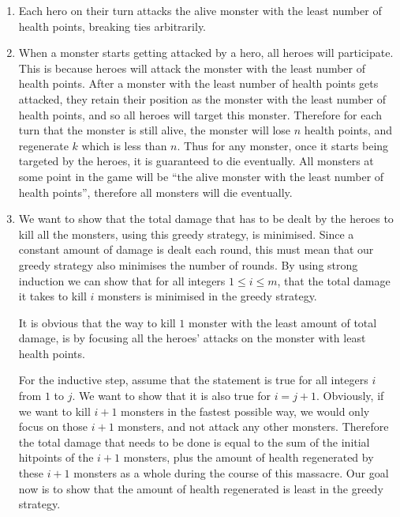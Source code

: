 \documentclass{article}
\begin{document}
\begin{solution}
\begin{enumerate}[label = (\alph*)]
    \item Each hero on their turn attacks the alive monster with the least number of health points, 
    breaking ties arbitrarily.

    \item When a monster starts getting attacked by a hero, all heroes will participate.
    This is because heroes will attack the monster with the least number of health points.
    After a monster with the least number of health points gets attacked, 
    they retain their position as the monster with the least number of health points,
    and so all heroes will target this monster.
    Therefore for each turn that the monster is still alive, 
    the monster will lose $n$ health points, and regenerate $k$ which is less than $n$.
    Thus for any monster, once it starts being targeted by the heroes, it is guaranteed to die eventually.
    All monsters at some point in the game will be ``the alive monster with the least number of health points'', 
    therefore all monsters will die eventually.

    \item We want to show that the total damage that has to be dealt by the heroes to kill all the monsters,
    using this greedy strategy, is minimised. 
    Since a constant amount of damage is dealt each round, this must mean that our greedy strategy also minimises the number of rounds.
    By using strong induction we can show that for all integers $1 \leq i \leq m$, 
    that the total damage it takes to kill $i$ monsters is minimised in the greedy strategy.

    It is obvious that the way to kill $1$ monster with the least amount of total damage, 
    is by focusing all the heroes' attacks on the monster with least health points.

    For the inductive step, assume that the statement is true for all integers $i$ from $1$ to $j$.
    We want to show that it is also true for $i=j+1$. 
    Obviously, if we want to kill $i+1$ monsters in the fastest possible way, 
    we would only focus on those $i+1$ monsters, and not attack any other monsters.
    Therefore the total damage that needs to be done is equal to the sum 
    of the initial hitpoints of the $i+1$ monsters, 
    plus the amount of health regenerated by these $i+1$ monsters as a whole during the course of this massacre.
    Our goal now is to show that the amount of health regenerated is least in the greedy strategy.


\end{enumerate}
\end{solution}
\end{document}
